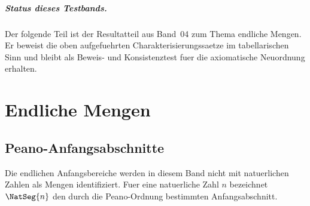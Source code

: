 \documentclass[main.tex]{subfiles}
\begin{document}

\paragraph{Status dieses Testbands.}
Der folgende Teil ist der Resultatteil aus Band~04 zum Thema endliche Mengen.
Er beweist die oben aufgefuehrten Charakterisierungssaetze im tabellarischen
Sinn und bleibt als Beweis- und Konsistenztest fuer die axiomatische Neuordnung
erhalten.
\chapter{Endliche Mengen}


\section{Peano-Anfangsabschnitte}

Die endlichen Anfangsbereiche werden in diesem Band nicht mit natuerlichen
Zahlen als Mengen identifiziert. Fuer eine natuerliche Zahl \(n\) bezeichnet
\(\NatSeg{n}\) den durch die Peano-Ordnung bestimmten Anfangsabschnitt.


\begin{tabproof}
\end{tabproof}

\begin{tabproof}
\end{tabproof}
\end{document}
